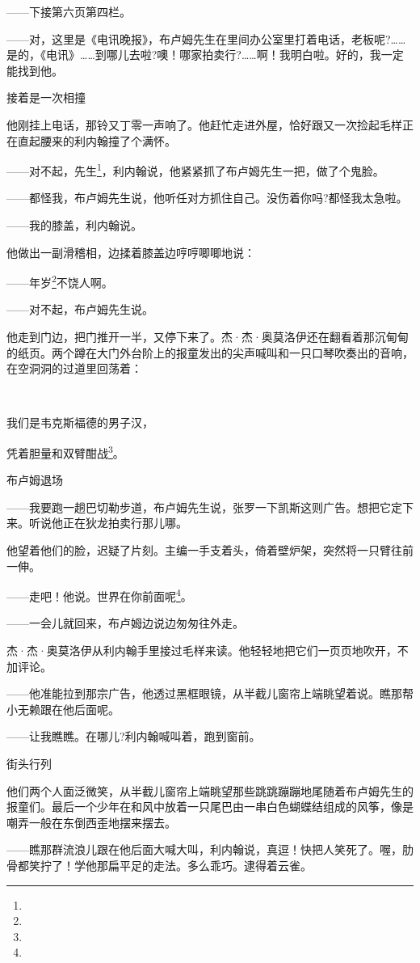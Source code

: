 \par ——下接第六页第四栏。
\par ——对，这里是《电讯晚报》，布卢姆先生在里间办公室里打着电话，老板呢?……是的，《电讯》……到哪儿去啦?噢！哪家拍卖行?……啊！我明白啦。好的，我一定能找到他。
\par 接着是一次相撞
\par 他刚挂上电话，那铃又丁零一声响了。他赶忙走进外屋，恰好跟又一次捡起毛样正在直起腰来的利内翰撞了个满怀。
\par ——对不起，先生\footnote{}，利内翰说，他紧紧抓了布卢姆先生一把，做了个鬼脸。
\par ——都怪我，布卢姆先生说，他听任对方抓住自己。没伤着你吗?都怪我太急啦。
\par ——我的膝盖，利内翰说。
\par 他做出一副滑稽相，边揉着膝盖边哼哼唧唧地说：
\par ——年岁\footnote{}不饶人啊。
\par ——对不起，布卢姆先生说。
\par 他走到门边，把门推开一半，又停下来了。杰·杰·奥莫洛伊还在翻看着那沉甸甸的纸页。两个蹲在大门外台阶上的报童发出的尖声喊叫和一只口琴吹奏出的音响，在空洞洞的过道里回荡着：
\par  
\par 我们是韦克斯福德的男子汉，
\par 凭着胆量和双臂酣战\footnote{}。
\par 布卢姆退场
\par ——我要跑一趟巴切勒步道，布卢姆先生说，张罗一下凯斯这则广告。想把它定下来。听说他正在狄龙拍卖行那儿哪。
\par 他望着他们的脸，迟疑了片刻。主编一手支着头，倚着壁炉架，突然将一只臂往前一伸。
\par ——走吧！他说。世界在你前面呢\footnote{}。
\par ——一会儿就回来，布卢姆边说边匆匆往外走。
\par 杰·杰·奥莫洛伊从利内翰手里接过毛样来读。他轻轻地把它们一页页地吹开，不加评论。
\par ——他准能拉到那宗广告，他透过黑框眼镜，从半截儿窗帘上端眺望着说。瞧那帮小无赖跟在他后面呢。
\par ——让我瞧瞧。在哪儿?利内翰喊叫着，跑到窗前。
\par 街头行列
\par 他们两个人面泛微笑，从半截儿窗帘上端眺望那些跳跳蹦蹦地尾随着布卢姆先生的报童们。最后一个少年在和风中放着一只尾巴由一串白色蝴蝶结组成的风筝，像是嘲弄一般在东倒西歪地摆来摆去。
\par ——瞧那群流浪儿跟在他后面大喊大叫，利内翰说，真逗！快把人笑死了。喔，肋骨都笑拧了！学他那扁平足的走法。多么乖巧。逮得着云雀。
